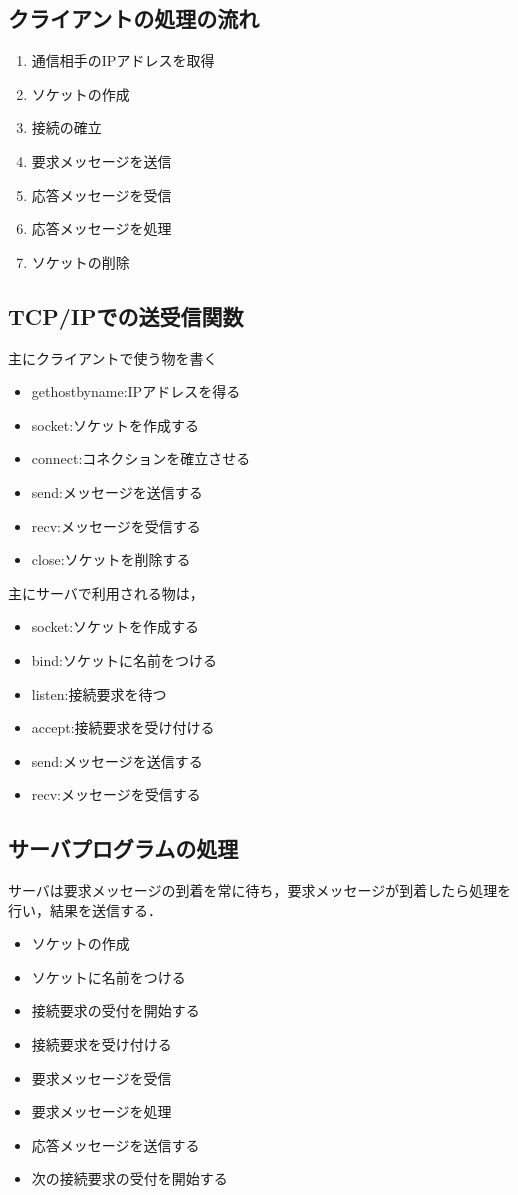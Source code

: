 \documentclass[a4j]{jarticle}
\begin{document}
\subsection{クライアントの処理の流れ}
\begin{enumerate}
\item 通信相手のIPアドレスを取得
\item ソケットの作成
\item 接続の確立
\item 要求メッセージを送信
\item 応答メッセージを受信
\item 応答メッセージを処理
\item ソケットの削除
\end{enumerate}

\subsection{TCP/IPでの送受信関数}
主にクライアントで使う物を書く
\begin{itemize}
\item gethostbyname:IPアドレスを得る
\item socket:ソケットを作成する
\item connect:コネクションを確立させる
\item send:メッセージを送信する
\item recv:メッセージを受信する
\item close:ソケットを削除する
\end{itemize}

主にサーバで利用される物は，
\begin{itemize}
\item socket:ソケットを作成する
\item bind:ソケットに名前をつける
\item listen:接続要求を待つ
\item accept:接続要求を受け付ける
\item send:メッセージを送信する
\item recv:メッセージを受信する
\end{itemize}


\subsection{サーバプログラムの処理}
サーバは要求メッセージの到着を常に待ち，要求メッセージが到着したら処理を行い，結果を送信する．
\begin{itemize}
\item ソケットの作成
\item ソケットに名前をつける
\item 接続要求の受付を開始する
\item 接続要求を受け付ける
\item 要求メッセージを受信
\item 要求メッセージを処理
\item 応答メッセージを送信する
\item 次の接続要求の受付を開始する
\end{itemize}
\end{document}
